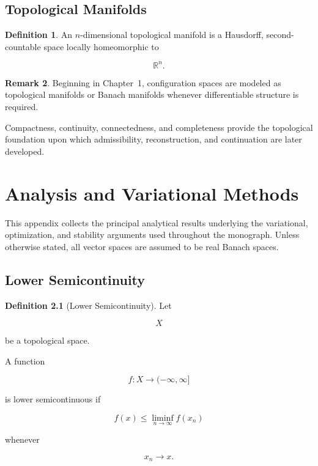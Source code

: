 \documentclass[11pt]{book}
\numberwithin{equation}{chapter}
\theoremstyle{definition}
\newtheorem{definition}{Definition}[chapter]
\newtheorem{remark}[definition]{Remark}
\theoremstyle{plain}
\begin{document}

\section{Topological Manifolds}

\begin{definition}

An \(n\)-dimensional topological manifold is a Hausdorff,
second-countable space locally homeomorphic to

\[
\mathbb R^n.
\]

\end{definition}


\begin{remark}

Beginning in Chapter~1, configuration spaces are modeled as
topological manifolds or Banach manifolds whenever differentiable
structure is required.

Compactness, continuity, connectedness, and completeness provide the
topological foundation upon which admissibility, reconstruction, and
continuation are later developed.

\end{remark}

\chapter{Analysis and Variational Methods}

This appendix collects the principal analytical results underlying the
variational, optimization, and stability arguments used throughout the
monograph. Unless otherwise stated, all vector spaces are assumed to be
real Banach spaces.


\section{Lower Semicontinuity}

\begin{definition}[Lower Semicontinuity]

Let

\[
X
\]

be a topological space.

A function

\[
f:X\rightarrow(-\infty,\infty]
\]

is lower semicontinuous if

\[
f(x)
\le
\liminf_{n\rightarrow\infty}
f(x_n)
\]

whenever

\[
x_n\rightarrow x.
\]

\end{definition}
\end{document}
